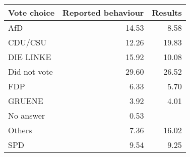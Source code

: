 
\begin{tabular}{l|r|r}
\hline
Vote choice & Reported behaviour & Results\\
\hline
AfD & 14.53 & 8.58\\
\hline
CDU/CSU & 12.26 & 19.83\\
\hline
DIE LINKE & 15.92 & 10.08\\
\hline
Did not vote & 29.60 & 26.52\\
\hline
FDP & 6.33 & 5.70\\
\hline
GRUENE & 3.92 & 4.01\\
\hline
No answer & 0.53 & \\
\hline
Others & 7.36 & 16.02\\
\hline
SPD & 9.54 & 9.25\\
\hline
\end{tabular}
